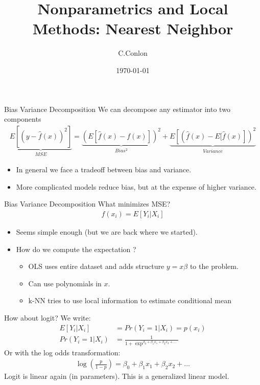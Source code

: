 \documentclass[11pt,handout,xcolor=pdftex,dvipsnames,table,mathserif,aspectratio=169]{beamer}
\title [Nonparametrics]{Nonparametrics and Local Methods: Nearest Neighbor}
\author{C.Conlon}
\institute{Applied Econometrics}
\date{\today}
\begin{document}
\begin{frame}
\titlepage
\end{frame}



\begin{frame}{Bias Variance Decomposition}
We can decompose any estimator into two components
\begin{align*}
\underbrace{E[(y- \hat{f}(x))^2]}_{MSE} =\underbrace{\left( E[\hat{f}(x) - f(x)] \right)^2}_{Bias^2}  +  \underbrace{E \left[ \left(\hat{f}(x) - E[\hat{f}(x) \right] \right)^2}_{Variance} 
\end{align*}
\begin{itemize}
\item In general we face a tradeoff between bias and variance.
\item More complicated models reduce \alert{bias}, but at the expense of higher \alert{variance}.
\end{itemize}
\end{frame}

\begin{frame}{Bias Variance Decomposition}
What minimizes MSE?
\begin{align*}
f(x_i) = E[Y_i | X_i] 
\end{align*}
\begin{itemize}
\item Seems simple enough (but we are back where we started).
\item How do we compute the expectation ?
\begin{itemize}
\item OLS uses entire dataset and adds structure $ y = x \beta$ to the problem.
\item Can use polynomials in $x$.
\item k-NN tries to use local information to estimate conditional mean
\end{itemize}
\end{itemize}
\end{frame}



\begin{frame}{How about logit?}
We write:
\begin{align*}
E[Y_i | X_i] &= Pr(Y_i =1 | X_i) = p(x_i)\\
 Pr(Y_i =1 | X_i)  &= \frac{1}{1+\exp^{\beta_0 + \beta_1 x_1 + \beta_2 x_2 + \ldots}}
\end{align*}
Or with the log odds transformation:
\begin{align*}
\log \left(\frac{p}{1-p} \right) =\beta_0 + \beta_1 x_1 + \beta_2 x_2 + \ldots
\end{align*}
Logit is \alert{linear} again (in parameters). This is a \alert{generalized linear model}.
\end{frame}
\end{document}
